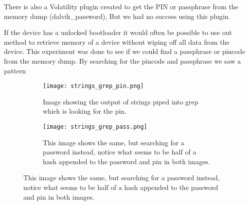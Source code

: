 There is also a Volatility plugin created to get the PIN or passphrase from the memory dump (dalvik_password),  %
But we had no success using this plugin.

If the device has a unlocked bootloader it would often be possible to use out 
method to retrieve memory of a device without wiping off all data from the 
device. This experiment was done to see if we could find a passphrase or 
pincode from the memory dump. By searching for the pincode and passphrase we saw a pattern \\


\begin{figure}
        
        \begin{subfigure}[b]{0.3\textwidth}
                \texttt{[image: strings\_grep\_pin.png]}
                \caption{Image showing the output of strings piped into grep
                which is looking for the pin.}
                \label{fig:gull}
        \end{subfigure}%
        \qquad \qquad \qquad \qquad \qquad %
        \begin{subfigure}[b]{0.3\textwidth}
                \texttt{[image: strings\_grep\_pass.png]}
                \caption{This image shows the same, but searching for a
                password instead, notice what seems to be half of a hash appended
            to the password and pin in both images.}
                \label{fig:tiger}
        \end{subfigure}
        \vspace{-20pt}

\end{figure}

